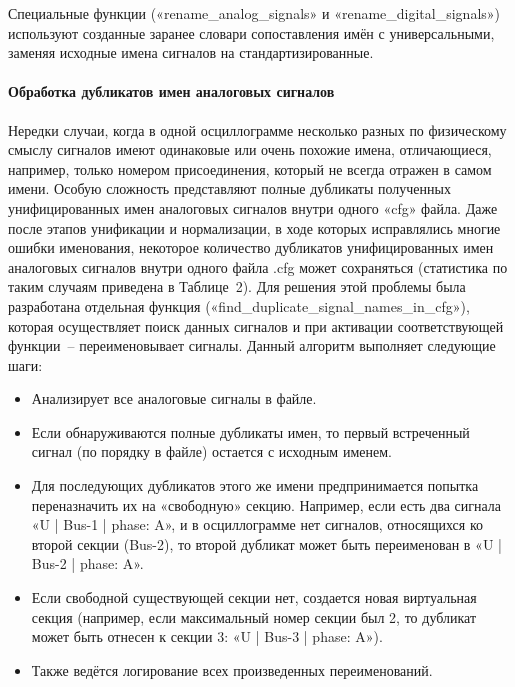 Специальные функции («rename\_\allowbreak analog\_\allowbreak signals» и «rename\_\allowbreak digital\_\allowbreak signals») используют созданные заранее словари сопоставления имён с универсальными, заменяя исходные имена сигналов на стандартизированные.

\paragraph{Обработка дубликатов имен аналоговых сигналов}
\mbox{}\par\vspace{0.2cm}

Нередки случаи, когда в одной осциллограмме несколько разных по физическому смыслу сигналов имеют одинаковые или очень похожие имена, отличающиеся, например, только номером присоединения, который не всегда отражен в самом имени. Особую сложность представляют полные дубликаты полученных унифицированных имен аналоговых сигналов внутри одного «cfg» файла. Даже после этапов унификации и нормализации, в ходе которых исправлялись многие ошибки именования, некоторое количество дубликатов унифицированных имен аналоговых сигналов внутри одного файла .cfg может сохраняться (статистика по таким случаям приведена в Таблице~2). Для решения этой проблемы была разработана отдельная функция («find\_\allowbreak duplicate\_\allowbreak signal\_\allowbreak names\_\allowbreak in\_\allowbreak cfg»), которая осуществляет поиск данных сигналов и при активации соответствующей функции~-- переименовывает сигналы. Данный алгоритм выполняет следующие шаги:

\begin{itemize}
  \item Анализирует все аналоговые сигналы в файле.
  \item Если обнаруживаются полные дубликаты имен, то первый встреченный сигнал (по порядку в файле) остается с исходным именем.
  \item Для последующих дубликатов этого же имени предпринимается попытка переназначить их на «свободную» секцию. Например, если есть два сигнала «U | Bus-1 | phase: A», и в осциллограмме нет сигналов, относящихся ко второй секции (Bus-2), то второй дубликат может быть переименован в «U | Bus-2 | phase: A».
  \item Если свободной существующей секции нет, создается новая виртуальная секция (например, если максимальный номер секции был 2, то дубликат может быть отнесен к секции 3: «U | Bus-3 | phase: A»).
  \item Также ведётся логирование всех произведенных переименований.
\end{itemize}

